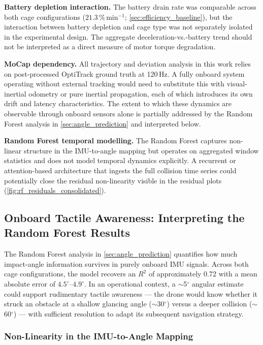\textbf{Battery depletion interaction.} The battery drain rate was comparable across both cage configurations ($21.3$\,\%\,min$^{-1}$; \autoref{sec:efficiency_baseline}), but the interaction between battery depletion and cage type was not separately isolated in the experimental design. The aggregate deceleration-vs.-battery trend should not be interpreted as a direct measure of motor torque degradation.

\textbf{MoCap dependency.} All trajectory and deviation analysis in this work relies on post-processed OptiTrack ground truth at 120\,Hz. A fully onboard system operating without external tracking would need to substitute this with visual-inertial odometry or pure inertial propagation, each of which introduces its own drift and latency characteristics. The extent to which these dynamics are observable through onboard sensors alone is partially addressed by the Random Forest analysis in \autoref{sec:angle_prediction} and interpreted below.

\textbf{Random Forest temporal modelling.} The Random Forest captures non-linear structure in the IMU-to-angle mapping but operates on aggregated window statistics and does not model temporal dynamics explicitly. A recurrent or attention-based architecture that ingests the full collision time series could potentially close the residual non-linearity visible in the residual plots (\autoref{fig:rf_residuals_consolidated}).

\subsection{Onboard Tactile Awareness: Interpreting the Random Forest Results}

The Random Forest analysis in \autoref{sec:angle_prediction} quantifies how much impact-angle information survives in purely onboard IMU signals. Across both cage configurations, the model recovers an $R^2$ of approximately 0.72 with a mean absolute error of $4.5^\circ$--$4.9^\circ$. In an operational context, a $\sim$5$^\circ$ angular estimate could support rudimentary tactile awareness --- the drone would know whether it struck an obstacle at a shallow glancing angle ($\sim$30$^\circ$) versus a deeper collision ($\sim$60$^\circ$) --- with sufficient resolution to adapt its subsequent navigation strategy.

\subsubsection{Non-Linearity in the IMU-to-Angle Mapping}

